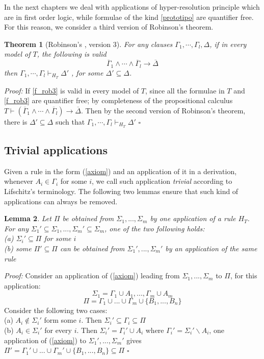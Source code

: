 \documentclass[a4paper,12pt,oneside]{book}
\newtheorem{theorem}{Theorem}[chapter]
\newtheorem{lemma}[theorem]{Lemma}
\newcommand*{\QED}{\hfill\ensuremath{\square}}
\let\e\wedge
\begin{document}
In the next chapters we deal with applications of hyper-resolution principle which are in first order logic, while formulae of the kind \ref{prototipo} are quantifier free. For this reason, we consider a third version of Robinson's theorem. 

\begin{theorem}[{Robinson's , version 3}] \label{Robinson3}
For any clauses $\Gamma_1, \cdots ,\Gamma_l , \Delta$, if in every model of $T$, the following is valid 
\begin{equation}\label{f_rob3}
\overline{\Gamma}_1\e\cdots\e\overline{\Gamma}_l \rightarrow \overline{\Delta}
\end{equation}
then  $\Gamma_1, \cdots ,\Gamma_l \vdash_{H_T} \Delta'$ , for some $\Delta' \subseteq \Delta$.
\end{theorem}

\textit{Proof:} If \ref{f_rob3} is valid in every model of $T$, since all the formulae in $T$ and \ref{f_rob3} are quantifier free; by completeness of the propositional calculus $T\vdash (\overline{\Gamma}_1\e\cdots\e\overline{\Gamma}_l )\rightarrow\overline{\Delta}$. Then by the second version of Robinson's theorem, there is $\Delta' \subseteq \Delta$ such that $\Gamma_1, \cdots ,\Gamma_l \vdash_{H_T} \Delta'$ \QED


\subsection*{Trivial applications}
	
Given a rule in the form (\ref{axiom}) and an application of it in a derivation, whenever $A_i \in \Gamma_i$ for some $i$, we call such application \textit{trivial} according to Lifschitz's terminology. The following two lemmas ensure that such kind of applications can always be removed.

\begin{lemma}\label{lemma1}
Let $\Pi$ be obtained from $\Sigma_1,...,\Sigma_m$ by one application of a rule $H_T$. For any $\Sigma_1' \subseteq \Sigma_1,...,\Sigma_m' \subseteq \Sigma_m  $, one of the two following holds:\\
(a) $\Sigma_i' \subseteq \Pi$ for some $i$\\
(b) some $\Pi '\subseteq\Pi$ can be obtained from $\Sigma_1 ',...,\Sigma_m '$ by an application of the same rule
\end{lemma}

\emph{Proof:} Consider an application of (\ref{axiom}) leading from  $\Sigma_1,...,\Sigma_m$ to $\Pi$, for this application:
$$\Sigma_1=\Gamma_1\cup A_1,...,\Gamma_m\cup A_m  $$
$$\Pi=\Gamma_1\cup ...\cup\Gamma_m\cup\{B_1,...,B_n\}$$
Consider the following two cases:\\
(a) $A_i \notin \Sigma_i '$ form some $i$. Then $\Sigma_i '\subseteq\Gamma_i\subseteq\Pi$
\\(b) $A_i \in \Sigma_i '$ for every $i$. Then $\Sigma_i '=\Gamma_i ' \cup A_i$ where $\Gamma_i '=\Sigma_i '\backslash A_i $, one application of (\ref{axiom}) to 
$\Sigma_1 ',...,\Sigma_m '$ gives 
$\Pi '=\Gamma_1 '\cup ...\cup\Gamma_m '\cup\{B_1,...,B_n\}\subseteq\Pi$
\QED
\end{document}
